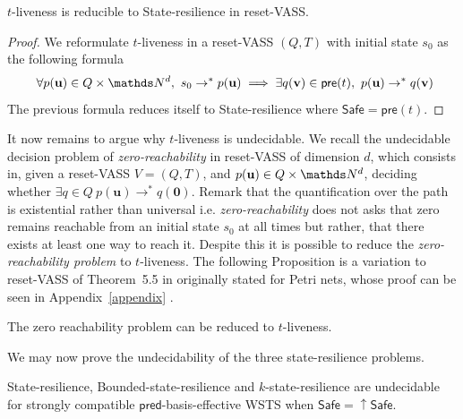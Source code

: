 \documentclass[runningheads]{llncs}
\newcommand{\pre}{\textsf{pre}}
\newcommand{\pred}{\textsf{pred}}
\newcommand{\Safe}{\textsf{Safe}}
\begin{document}
\begin{proposition}\label{reductions}
{\sc $t$-liveness} is reducible to {\sc State-resilience} in reset-VASS.
\end{proposition}


\begin{proof}
We reformulate $t$-liveness 
in a 
reset-VASS $(Q,T)$ 
with initial state $s_0$
as the following formula
\[ ~ \forall p(\textbf{u}) \in Q \times \N^d, 
~ s_0 \rightarrow^* p(\textbf{u}) \implies \exists q(\textbf{v}) \in \pre(t), ~ p(\textbf{u}) \rightarrow^{*} q(\textbf{v})\]  
The previous formula reduces itself to {\sc State-resilience}
where $\Safe = \pre(t)$.
\end{proof}

It now remains to argue why {\sc $t$-liveness} is undecidable.
We  recall the
 undecidable \cite{araki1976PN} decision problem of {\em zero-reachability} in reset-VASS of dimension $d$, which consists in, given a
reset-VASS $V=(Q,T)$, and $p(\textbf{u}) \in Q \times \N^d$,
deciding whether $\exists q \in Q ~ p(\textbf{u}) \to^* q(\textbf{0})$.
%
Remark that the quantification over the path is existential rather than universal i.e. 
{\em zero-reachability}
does not asks that zero remains reachable from an initial state $s_0$ at all times but rather, that there exists at least one way to reach it.
Despite this it is possible to reduce 
the {\em zero-reachability problem} 
to
{\sc $t$-liveness}.
The following Proposition is a variation  to reset-VASS of Theorem~5.5 in \cite{peterson1981petri} originally stated for Petri nets, whose proof can be seen in Appendix~\ref{appendix}%
.
\begin{proposition}\label{liveness reset}
The  zero reachability problem can be reduced to {\sc $t$-liveness}.
\end{proposition}


We may now prove the undecidability of the three state-resilience problems.


\begin{proposition}\label{srp up down}
{\sc State-resilience},
{\sc Bounded-state-resilience} and
{\sc $k$-state-resilience}
are undecidable for strongly compatible $\pred$-basis-effective WSTS
when
$\Safe=\mathop{\uparrow} \Safe$.
\end{proposition}
\end{document}
